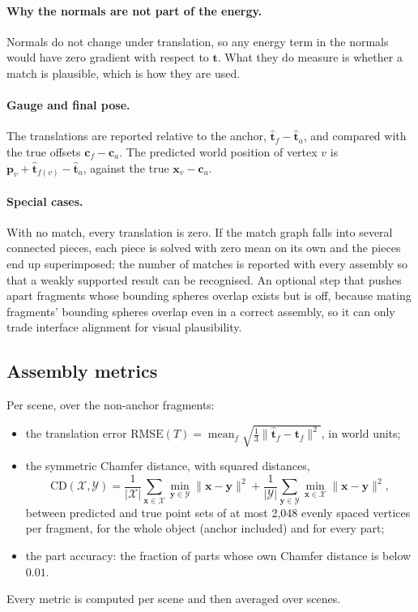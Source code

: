 \documentclass[11pt,a4paper]{article}
\theoremstyle{remark}
\newcommand{\x}{\mathbf{x}}
\newcommand{\y}{\mathbf{y}}
\newcommand{\norm}[1]{\lVert #1\rVert}
\DeclareMathOperator{\mean}{mean}
\begin{document}
\paragraph{Why the normals are not part of the energy.} Normals do not change under translation, so any energy term in the normals would have zero gradient with respect to $\mathbf t$. What they do measure is whether a match is plausible, which is how they are used.

\paragraph{Gauge and final pose.} The translations are reported relative to the anchor, $\hat{\mathbf t}_f-\hat{\mathbf t}_a$, and compared with the true offsets $\mathbf c_f-\mathbf c_a$. The predicted world position of vertex $v$ is $\mathbf p_v+\hat{\mathbf t}_{f(v)}-\hat{\mathbf t}_a$, against the true $\x_v-\mathbf c_a$.

\paragraph{Special cases.} With no match, every translation is zero. If the match graph falls into several connected pieces, each piece is solved with zero mean on its own and the pieces end up superimposed; the number of matches is reported with every assembly so that a weakly supported result can be recognised. An optional step that pushes apart fragments whose bounding spheres overlap exists but is off, because mating fragments' bounding spheres overlap even in a correct assembly, so it can only trade interface alignment for visual plausibility.

\subsection{Assembly metrics}
\label{sec:assemblymetrics}
Per scene, over the non-anchor fragments:
\begin{itemize}
  \item the translation error $\mathrm{RMSE}(T)=\mean_f\sqrt{\tfrac13\norm{\hat{\mathbf t}_f-\mathbf t_f}^2}$, in world units;
  \item the symmetric Chamfer distance, with squared distances,
  \begin{equation}
    \mathrm{CD}(\mathcal X,\mathcal Y)=\frac1{|\mathcal X|}\sum_{\x\in\mathcal X}\min_{\y\in\mathcal Y}\norm{\x-\y}^2+\frac1{|\mathcal Y|}\sum_{\y\in\mathcal Y}\min_{\x\in\mathcal X}\norm{\x-\y}^2,
  \end{equation}
  between predicted and true point sets of at most 2{,}048 evenly spaced vertices per fragment, for the whole object (anchor included) and for every part;
  \item the part accuracy: the fraction of parts whose own Chamfer distance is below $0.01$.
\end{itemize}
Every metric is computed per scene and then averaged over scenes.
\end{document}
